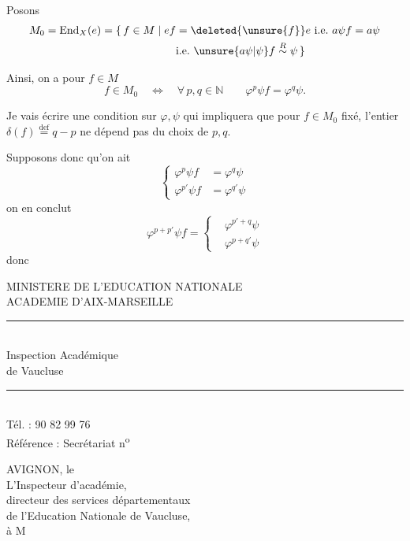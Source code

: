 
Posons
\[
\begin{aligned}M_0=\mathrm{End}_X(e)=\{\,f\in M\mid ef&=\deleted{\unsure{f}}e\ \text{i.e.}\ a\psi f=a\psi\\ &\text{i.e.}\ \unsure{a\psi|\psi}f\overset{R}\sim\psi\,\}\end{aligned}
\]

Ainsi, on a pour $f\in M$
\[
f\in M_0\quad\Longleftrightarrow\quad\forall\,p,q\in\mathbb N\qquad\varphi^p\psi f=\varphi^q\psi.
\]

Je vais écrire une condition sur $\varphi,\psi$ qui impliquera que pour $f\in M_0$ fixé, l'entier $\delta(f)\overset{\mathrm{def}}{=}q-p$ ne dépend pas du choix de $p,q$.

Supposons donc qu'on ait
\[
\left\{\begin{aligned}\varphi^p\psi f&=\varphi^q\psi\\ \varphi^{p'}\psi f&=\varphi^{q'}\psi\end{aligned}\right.
\]
on en conclut
\[
\varphi^{p+p'}\psi f=\left\{\begin{aligned}&\varphi^{p'+q}\psi\\ &\varphi^{p+q'}\psi\end{aligned}\right.
\]
donc
\par\smallskip
{\footnotesize\noindent\begin{minipage}[t]{.46\linewidth}\raggedright
MINISTERE DE L'EDUCATION NATIONALE\\ ACADEMIE D'AIX-MARSEILLE\\ \rule{2.6em}{.3pt}\\ Inspection Académique\\ de Vaucluse\\ \rule{2.6em}{.3pt}\\ Tél. : 90 82 99 76\\ Référence : Secrétariat n\textsuperscript{o}
\end{minipage}\hfill%
\begin{minipage}[t]{.51\linewidth}\raggedright
AVIGNON, le\\ L'Inspecteur d'académie,\\ directeur des services départementaux\\ de l'Education Nationale de Vaucluse,\\ à M
\end{minipage}\par}

